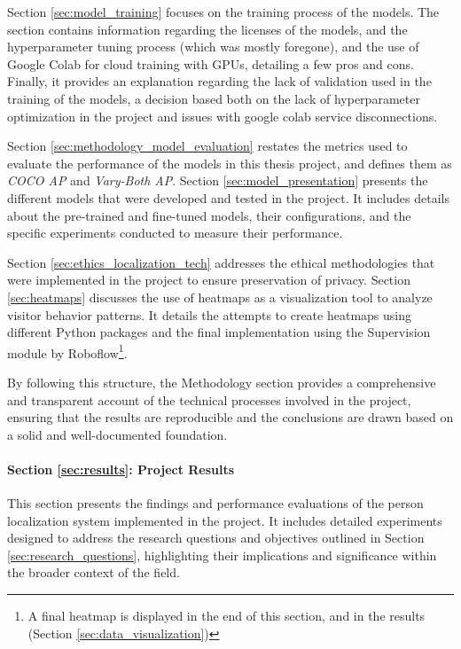Section \ref{sec:model_training} focuses on the training process of the models. The section contains information regarding the licenses of the models, and the hyperparameter tuning process (which was mostly foregone), and the use of Google Colab for cloud training with GPUs, detailing a few pros and cons. Finally, it provides an explanation regarding the lack of validation used in the training of the models, a decision based both on the lack of hyperparameter optimization in the project and issues with google colab service disconnections. 

Section \ref{sec:methodology_model_evaluation} restates the metrics used to evaluate the performance of the models in this thesis project, and defines them as \textit{COCO AP} and \textit{Vary-Both AP}. Section \ref{sec:model_presentation} presents the different models that were developed and tested in the project. It includes details about the pre-trained and fine-tuned models, their configurations, and the specific experiments conducted to measure their performance.

Section \ref{sec:ethics_localization_tech} addresses the ethical methodologies that were implemented in the project to ensure preservation of privacy. Section \ref{sec:heatmaps} discusses the use of heatmaps as a visualization tool to analyze visitor behavior patterns. It details the attempts to create heatmaps using different Python packages and the final implementation using the Supervision module by Roboflow\footnote{A final heatmap is displayed in the end of this section, and in the results (Section \ref{sec:data_visualization})}.

By following this structure, the Methodology section provides a comprehensive and transparent account of the technical processes involved in the project, ensuring that the results are reproducible and the conclusions are drawn based on a solid and well-documented foundation. 

\newpage
\paragraph{Section \ref{sec:results}: Project Results} 
This section presents the findings and performance evaluations of the person localization system implemented in the project. It includes detailed experiments designed to address the research questions and objectives outlined in Section \ref{sec:research_questions}, highlighting their implications and significance within the broader context of the field.

